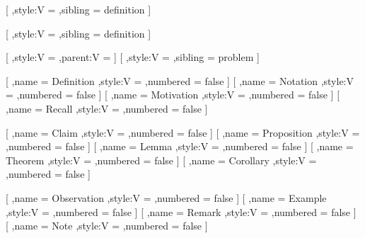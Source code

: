         [
            ,style:V = \redbox
            ,sibling = definition
        ]

        [
            ,style:V = \bluebox
            ,sibling = definition
        ]

        [
            ,style:V = \purplebox
            ,parent:V = \ProblemParent
        ]
        [
            ,style:V = \purplebox
            ,sibling = problem
        ]

        [
            ,name = Definition
            ,style:V = \greenbox
            ,numbered = false
        ]
        [
            ,name = Notation
            ,style:V = \greenbox
            ,numbered = false
        ]
        [
            ,name = Motivation
            ,style:V = \greenbox
            ,numbered = false
        ]
        [
            ,name = Recall
            ,style:V = \greenbox
            ,numbered = false
        ]

        [
            ,name = Claim
            ,style:V = \redbox
            ,numbered = false
        ]
        [
            ,name = Proposition
            ,style:V = \redbox
            ,numbered = false
        ]
        [
            ,name = Lemma
            ,style:V = \redbox
            ,numbered = false
        ]
        [
            ,name = Theorem
            ,style:V = \redbox
            ,numbered = false
        ]
        [
            ,name = Corollary
            ,style:V = \redbox
            ,numbered = false
        ]

        [
            ,name = Observation
            ,style:V = \bluebox
            ,numbered = false
        ]
        [
            ,name = Example
            ,style:V = \bluebox
            ,numbered = false
        ]
        [
            ,name = Remark
            ,style:V = \bluebox
            ,numbered = false
        ]
        [
            ,name = Note
            ,style:V = \bluebox
            ,numbered = false
        ]

